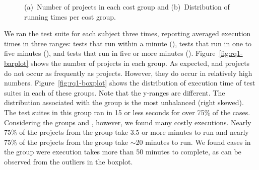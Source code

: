 \documentclass[10pt,journal,compsoc]{IEEEtran}
\begin{document}
\begin{figure}[ht]%
  \vspace{-3mm}
  \centering
  \qquad
  \vspace{-2mm}
  \caption{(a)~Number of projects in each cost group and
    (b)~Distribution of running times per cost group.}
\vspace{-5mm}
\end{figure}


We ran the test suite for each subject three times, reporting averaged
execution times in three ranges: tests that run within a minute
(\shortg{}), tests that run in one to five minutes (\medg{}), and
tests that run in five or more minutes (\longg{}). Figure~\ref{fig:rq1-barplot} shows the number of projects in
each group.  As expected, \longg{} and \medg{} projects do not occur
as frequently as \shortg{} projects.  However, they do occur in
relatively high numbers.
Figure~\ref{fig:rq1-boxplot} shows the distribution of execution time of
test suites in each of these groups.
Note that the y-ranges are different.
The distribution associated with the \shortg{} group is the most
unbalanced (right skewed).
The test suites in this group ran in 15 or less seconds for
over 75\% of the cases. Considering the groups \medg{} and \longg{},
however, we found many costly executions.  Nearly 75\% of the projects
from the \medg{} group take 3.5 or more minutes to run and nearly 75\% of
the projects from the \longg{} group take $\sim$20 minutes to run.  We
found cases in the \longg{} group were execution takes more than 50 minutes
to complete, as can be observed from the outliers in the boxplot.
\end{document}
